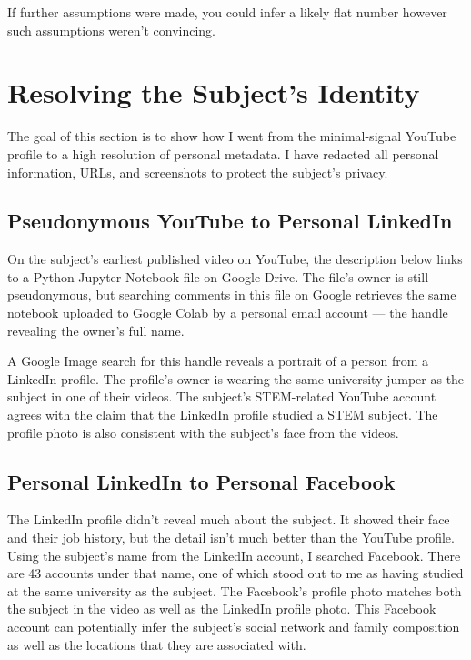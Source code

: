 \documentclass[a4paper,11pt]{report}
\begin{document}
If further assumptions were made, you could infer a likely flat number however such assumptions weren't convincing.

\section{Resolving the Subject's Identity}

The goal of this section is to show how I went from the minimal-signal YouTube profile to a high resolution of personal metadata. I have redacted all personal information, URLs, and screenshots to protect the subject's privacy.

\subsection{Pseudonymous YouTube to Personal LinkedIn}

On the subject's earliest published video on YouTube, the description below links to a Python Jupyter Notebook file on Google Drive. The file's owner is still pseudonymous, but searching comments in this file on Google retrieves the same notebook uploaded to Google Colab by a personal email account --- the handle revealing the owner's full name.

A Google Image search for this handle reveals a portrait of a person from a LinkedIn profile. The profile's owner is wearing the same university jumper as the subject in one of their videos. The subject's STEM-related YouTube account agrees with the claim that the LinkedIn profile studied a STEM subject. The profile photo is also consistent with the subject's face from the videos.

\subsection{Personal LinkedIn to Personal Facebook}

The LinkedIn profile didn't reveal much about the subject. It showed their face and their job history, but the detail isn't much better than the YouTube profile. Using the subject's name from the LinkedIn account, I searched Facebook. There are 43 accounts under that name, one of which stood out to me as having studied at the same university as the subject. The Facebook's profile photo matches both the subject in the video as well as the LinkedIn profile photo. This Facebook account can potentially infer the subject's social network and family composition as well as the locations that they are associated with.
\end{document}
